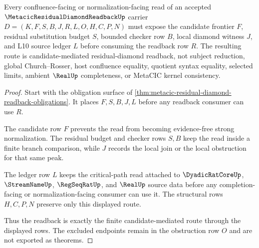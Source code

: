 \begin{theorem}
\label{thm:metacic-residual-diamond-readback-candidate-route}
Every confluence-facing or normalization-facing read of an accepted $\MetacicResidualDiamondReadbackUp$ carrier $D=(K,F,S,B,J,R,L,O,H,C,P,N)$ must expose the candidate frontier $F$, residual substitution budget $S$, bounded checker row $B$, local diamond witness $J$, and L10 source ledger $L$ before consuming the readback row $R$. The resulting route is candidate-mediated residual-diamond readback, not subject reduction, global Church--Rosser, host confluence equality, quotient syntax equality, selected limits, ambient $\RealUp$ completeness, or MetaCIC kernel consistency.
\end{theorem}
\begin{proof}
Start with the obligation surface of \autoref{thm:metacic-residual-diamond-readback-obligations}. It places $F,S,B,J,L$ before any readback consumer can use $R$.

The candidate row $F$ prevents the read from becoming evidence-free strong normalization. The residual budget and checker rows $S,B$ keep the read inside a finite branch comparison, while $J$ records the local join or the local obstruction for that same peak.

The ledger row $L$ keeps the critical-path read attached to $\DyadicRatCoreUp$, $\StreamNameUp$, $\RegSeqRatUp$, and $\RealUp$ source data before any completion-facing or normalization-facing consumer can use it. The structural rows $H,C,P,N$ preserve only this displayed route.

Thus the readback is exactly the finite candidate-mediated route through the displayed rows. The excluded endpoints remain in the obstruction row $O$ and are not exported as theorems.
\end{proof}



